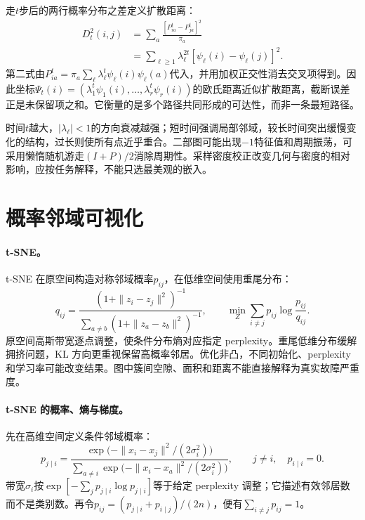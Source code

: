 走$t$步后的两行概率分布之差定义扩散距离：
\begin{align}
 D_t^2(i,j)&=\sum_a\frac{[P^t_{ia}-P^t_{ja}]^2}{\pi_a}\\
 &=\sum_{\ell\geq1}\lambda_\ell^{2t}
 [\psi_\ell(i)-\psi_\ell(j)]^2.
\end{align}
第二式由$P^t_{ia}=\pi_a\sum_\ell\lambda_\ell^t\psi_\ell(i)\psi_\ell(a)$代入，并用加权正交性消去交叉项得到。因此坐标$\Psi_t(i)=(\lambda_1^t\psi_1(i),\ldots,\lambda_r^t\psi_r(i))$的欧氏距离近似扩散距离，截断误差正是未保留项之和。它衡量的是多个路径共同形成的可达性，而非一条最短路径。

时间$t$越大，$|\lambda_\ell|<1$的方向衰减越强；短时间强调局部邻域，较长时间突出缓慢变化的结构，过长则使所有点近乎重合。二部图可能出现$-1$特征值和周期振荡，可采用懒惰随机游走$(I+P)/2$消除周期性。采样密度校正改变几何与密度的相对影响，应按任务解释，不能只选最美观的嵌入。

\section{概率邻域可视化}
\paragraph{t-SNE。}
t-SNE 在原空间构造对称邻域概率$p_{ij}$，在低维空间使用重尾分布\cite{vandermaaten2008tsne}：
\begin{equation}
 q_{ij}=\frac{(1+\|z_i-z_j\|^2)^{-1}}
 {\sum_{a\ne b}(1+\|z_a-z_b\|^2)^{-1}},\qquad
 \min_Z\sum_{i\ne j}p_{ij}\log\frac{p_{ij}}{q_{ij}}.
\end{equation}
原空间高斯带宽逐点调整，使条件分布熵对应指定 perplexity。重尾低维分布缓解拥挤问题，KL 方向更重视保留高概率邻居。优化非凸，不同初始化、perplexity 和学习率可能改变结果。图中簇间空隙、面积和距离不能直接解释为真实故障严重度。

\paragraph{t-SNE 的概率、熵与梯度。}
先在高维空间定义条件邻域概率：
\begin{equation}
 p_{j\mid i}=
 \frac{\exp\bigl(-\|x_i-x_j\|^2/(2\sigma_i^2)\bigr)}
 {\sum_{a\ne i}\exp\bigl(-\|x_i-x_a\|^2/(2\sigma_i^2)\bigr)},
 \qquad j\ne i,\quad p_{i\mid i}=0.
\end{equation}
带宽$\sigma_i$按$\exp[-\sum_jp_{j\mid i}\log p_{j\mid i}]$等于给定 perplexity 调整；它描述有效邻居数而不是类别数。再令$p_{ij}=(p_{j\mid i}+p_{i\mid j})/(2n)$，便有$\sum_{i\ne j}p_{ij}=1$。

